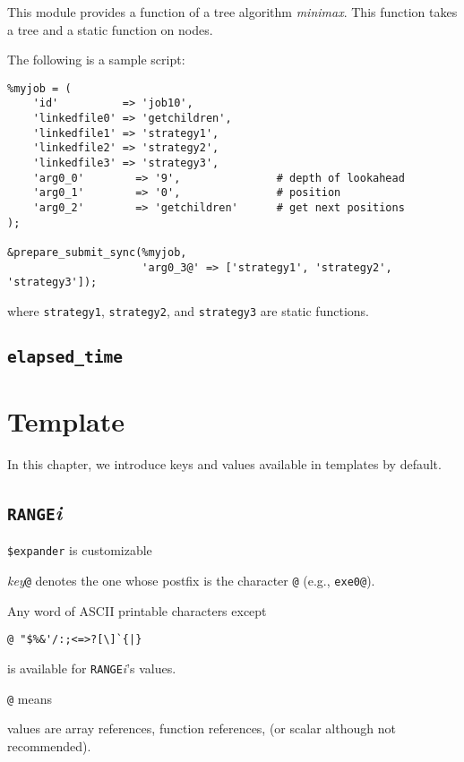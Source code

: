 \documentclass[a4paper,10pt]{report}
\begin{document}
This module provides a function of a tree algorithm \textit{minimax}.
This function takes a tree and a static function on nodes.

The following is a sample script:
\begin{boxnote}
\begin{verbatim}
%myjob = (
    'id'          => 'job10',
    'linkedfile0' => 'getchildren',
    'linkedfile1' => 'strategy1',
    'linkedfile2' => 'strategy2',
    'linkedfile3' => 'strategy3',
    'arg0_0'        => '9',               # depth of lookahead
    'arg0_1'        => '0',               # position
    'arg0_2'        => 'getchildren'      # get next positions
);

&prepare_submit_sync(%myjob,
                     'arg0_3@' => ['strategy1', 'strategy2', 'strategy3']);
\end{verbatim}
\end{boxnote}
\noindent
where \texttt{strategy1}, \texttt{strategy2}, and
\texttt{strategy3} are static functions.

\section{\texttt{elapsed\_time}}



\chapter{Template}\label{chapjobdefhash}

In this chapter, we introduce keys and values available in templates
by default.

\section{\texttt{RANGE}\textit{i}}

\texttt{\$expander} is customizable

\textit{key}\texttt{@} denotes the one whose postfix is the
character \texttt{@} (e.g., \texttt{exe0@}).


Any word of ASCII printable characters except
\begin{center}
\verb*+@ "$%&'/:;<=>?[\]`{|}+        %
\end{center}
is available for \texttt{RANGE}\textit{i}'s values.

\texttt{@} means

values are array references, function references, (or scalar although
not recommended).
\end{document}
